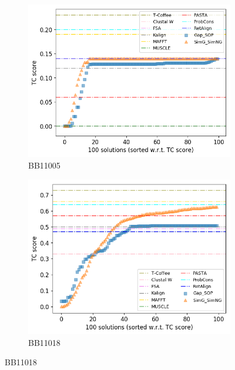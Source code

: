 \begin{figure}[!htbp]
	\begin{adjustwidth}{-1cm}{-1cm}
	\centering
		\begin{subfigure}{0.22\textwidth}
			\includegraphics[width=\columnwidth]{Figure/summary/precomputedInit/Balibase/BB11005_tc_density_single_run_2}
			\caption{BB11005}
		\end{subfigure}	
		\begin{subfigure}{0.22\textwidth}
			\includegraphics[width=\columnwidth]{Figure/summary/precomputedInit/Balibase/BB11018_tc_density_single_run_2}
			\caption{BB11018}
		\end{subfigure}

\end{adjustwidth}
\end{figure}
